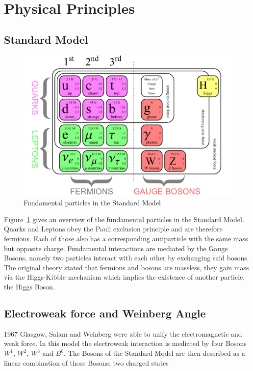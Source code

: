 
\section{Physical Principles}
\subsection{Standard Model}
\begin{figure}[hb]
	\centering
	\includegraphics[scale=0.4]{graphics/SM1.png}
	\caption[Standard Model]{Fundamental particles in the Standard Model\cite{uni zuerich}} 
	\label{fig:principles:Standard_Model_of_Elementary_Particles}
\end{figure}

Figure~\ref{fig:principles:Standard_Model_of_Elementary_Particles} gives an overview of the fundamental particles in the Standard Model. Quarks and Leptons obey the Pauli exclusion principle and are therefore fermions. Each of those also has a corresponding antiparticle with the same mass but opposite charge. Fundamental interactions are mediated by the Gauge Bosons, namely two particles interact with each other by exchanging said bosons. The original theory stated that fermions and bosons are massless, they gain mass via the Higgs-Kibble mechanism which implies the existence of another particle, the Higgs Boson\cite{muenchen}.

\subsection{Electroweak force and Weinberg Angle}
1967 Glasgow, Salam and Weinberg were able to unify the electromagnetic and weak force. In this model the electroweak interaction is mediated by four Bosons $W^1$, $W^2$, $W^3$ and $B^0$. The Bosons of the Standard Model are then described as a linear combination of those Bosons; two charged states

